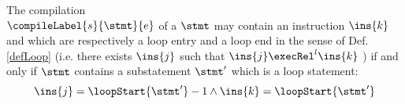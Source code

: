\begin{compProp}\label{compile:prop:compProp4}  %

The compilation \\ $\compileLabel{s}{\stmt}{e}$ of a $\stmt$ may contain an instruction $\ins{k}$ and   which are respectively 
a loop entry and a loop end  in the sense of Def.
\ref{defLoop} (i.e. there exists $\ins{j}$ such that $\ins{j} \execRel^{l} \ins{k}$ ) if and only if  $\stmt$  contains 
 a substatement $\stmt'$ which is a loop statement:
 $$ \ins{j} = \loopStart{\stmt'}  - 1 \wedge  \ins{k} = \loopStart{\stmt'}  $$


	   
              
             

\end{compProp}
 


